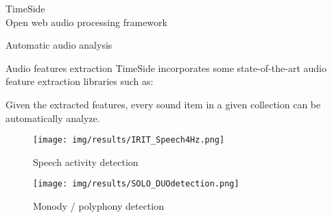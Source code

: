 \documentclass[final, hyperref, table]{beamer}
\begin{document}
\begin{frame}[containsverbatim]{}
\begin{columns}[T]
\begin{column}[T]{.5\linewidth}
\begin{block}{{\Large TimeSide}\\Open web audio processing framework}
\end{block}
\begin{block}{Automatic audio analysis}
  \begin{center}
    \begin{minipage}[h]{0.97\linewidth}
      \begin{beamerboxesrounded}%
        [shadow=true]%
        {Audio features extraction}
        TimeSide incorporates some state-of-the-art audio feature
        extraction libraries such as:


        Given the extracted features, every sound item in a given
        collection can be automatically analyze. 
      \end{beamerboxesrounded}

      \begin{center}
        \begin{figure}[h]
          \centering
          \texttt{[image: img/results/IRIT\_Speech4Hz.png]}
          \caption{Speech activity detection}
          \label{fig:TS_SAD}
        \end{figure}
        \begin{figure}[h]
          \centering
          \texttt{[image: img/results/SOLO\_DUOdetection.png]}
          \caption{Monody / polyphony detection}
          \label{fig:TS_Monopoly}
        \end{figure}

      \end{center}
    \end{minipage}
  \end{center}
\end{block}
%     
 

\end{column}
\end{columns}
\end{frame}
\end{document}
